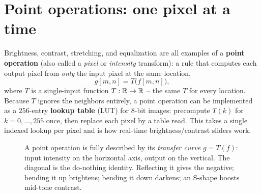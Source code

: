 \section{Point operations: one pixel at a time}
\label{ch30:point-ops}

Brightness, contrast, stretching, and equalization are all examples of a
\textbf{point operation} (also called a \emph{pixel} or \emph{intensity}
transform): a rule that computes each output pixel from \emph{only} the input
pixel at the same location,
\begin{equation}
\label{ch30:point-op}
g[m,n] = T\bigl(f[m,n]\bigr),
\end{equation}
where $T$ is a single-input function $T:\mathbb{R}\to\mathbb{R}$ -- the same $T$ for every
location. Because $T$ ignores the neighbors entirely, a point operation can be
implemented as a $256$-entry \textbf{lookup table} (LUT) for 8-bit images:
precompute $T(k)$ for $k=0,\dots,255$ once, then replace each pixel by a table
read. This takes a single indexed lookup per pixel and is how real-time brightness/contrast sliders
work.

\begin{figure}[H]
\centering
{}
\caption{A point operation is fully described by its \emph{transfer curve}
$g=T(f)$: input intensity on the horizontal axis, output on the vertical. The
diagonal is the do-nothing identity. Reflecting it gives the negative; bending it
up brightens; bending it down darkens; an S-shape boosts mid-tone contrast.}
\label{ch30:fig-transfer}
\end{figure}

